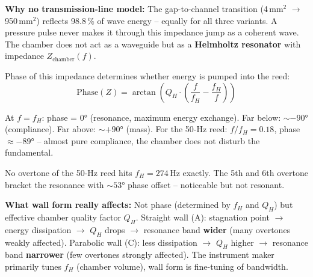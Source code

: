 \documentclass[11pt,a4paper]{article}
\begin{document}
\textbf{Why no transmission-line model:} The gap-to-channel transition (4\,mm$^2$ $\to$ 950\,mm$^2$) reflects 98.8\,\% of wave energy -- equally for all three variants. A pressure pulse never makes it through this impedance jump as a coherent wave. The chamber does not act as a waveguide but as a \textbf{Helmholtz resonator} with impedance $Z_\text{chamber}(f)$.

Phase of this impedance determines whether energy is pumped into the reed:
\begin{equation}
\text{Phase}(Z) = \arctan\!\left(Q_H \cdot \left(\frac{f}{f_H} - \frac{f_H}{f}\right)\right)
\end{equation}

At $f = f_H$: phase = 0° (resonance, maximum energy exchange). Far below: $\sim -90°$ (compliance). Far above: $\sim +90°$ (mass). For the 50-Hz reed: $f/f_H = 0.18$, phase $\approx -89°$ -- almost pure compliance, the chamber does not disturb the fundamental.

\begin{table}[H]
\centering\small
{}
\caption{Phase of chamber impedance at overtones of a 50-Hz reed ($f_H = 274$\,Hz, $Q_H \approx 7$)}
\end{table}

No overtone of the 50-Hz reed hits $f_H = 274$\,Hz exactly. The 5th and 6th overtone bracket the resonance with $\sim 53°$ phase offset -- noticeable but not resonant.

\begin{warnbox}
\textbf{What wall form really affects:} Not phase (determined by $f_H$ and $Q_H$) but effective chamber quality factor $Q_H$. Straight wall (A): stagnation point $\to$ energy dissipation $\to$ $Q_H$ drops $\to$ resonance band \textbf{wider} (many overtones weakly affected). Parabolic wall (C): less dissipation $\to$ $Q_H$ higher $\to$ resonance band \textbf{narrower} (few overtones strongly affected). The instrument maker primarily tunes $f_H$ (chamber volume), wall form is fine-tuning of bandwidth.
\end{warnbox}
\end{document}
